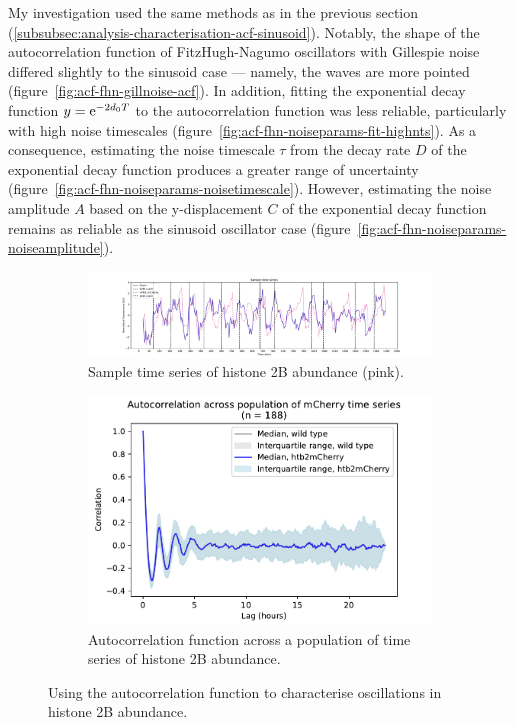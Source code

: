 My investigation used the same methods as in the previous section (\ref{subsubsec:analysis-characterisation-acf-sinusoid}).
Notably, the shape of the autocorrelation function of FitzHugh-Nagumo oscillators with Gillespie noise differed slightly to the sinusoid case --- namely, the waves are more pointed (figure~\ref{fig:acf-fhn-gillnoise-acf}).
In addition, fitting the exponential decay function $y = \mathrm{e}^{-2d_{0}T}$ to the autocorrelation function was less reliable, particularly with high noise timescales (figure~\ref{fig:acf-fhn-noiseparams-fit-highnts}).
As a consequence, estimating the noise timescale $\tau$ from the decay rate $D$ of the exponential decay function produces a greater range of uncertainty (figure~\ref{fig:acf-fhn-noiseparams-noisetimescale}).
However, estimating the noise amplitude $A$ based on the y-displacement $C$ of the exponential decay function remains as reliable as the sinusoid oscillator case (figure~\ref{fig:acf-fhn-noiseparams-noiseamplitude}).

\begin{figure}
  \centering
  \begin{subfigure}[t]{0.9\textwidth}
  \centering
    \includegraphics[width=\linewidth]{htb2mCherry_26643_plots_purple_01.pdf}
    \caption{
      Sample time series of histone 2B abundance (pink).
    }
    \label{fig:acf-fhn-biol-ts}
  \end{subfigure}

  \begin{subfigure}[t]{0.7\textwidth}
  \centering
    \includegraphics[width=\linewidth]{htb2mCherry_26643_plots_mCh_06.png}
    \caption{
      Autocorrelation function across a population of time series of histone 2B abundance.
    }
    \label{fig:acf-fhn-biol-acf}
  \end{subfigure}

  \caption{
    Using the autocorrelation function to characterise oscillations in histone 2B abundance.
  }
  \label{fig:acf-fhn-biol}
\end{figure}

